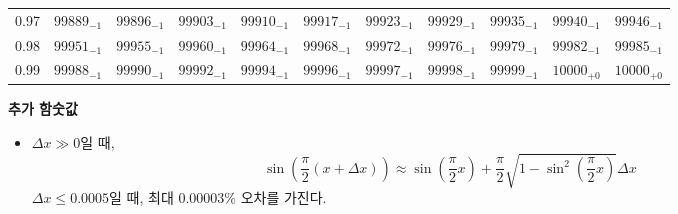 \documentclass[10pt, a4paper]{article}
\begin{document}
\begin{center}
\begin{longtable}{c | c c c c c | c c c c c}
        0.97 & \({99889}_{-1}\) & \({99896}_{-1}\) & \({99903}_{-1}\) & \({99910}_{-1}\) & \({99917}_{-1}\) & \({99923}_{-1}\) & \({99929}_{-1}\) & \({99935}_{-1}\) & \({99940}_{-1}\) & \({99946}_{-1}\)\\
        0.98 & \({99951}_{-1}\) & \({99955}_{-1}\) & \({99960}_{-1}\) & \({99964}_{-1}\) & \({99968}_{-1}\) & \({99972}_{-1}\) & \({99976}_{-1}\) & \({99979}_{-1}\) & \({99982}_{-1}\) & \({99985}_{-1}\)\\
        0.99 & \({99988}_{-1}\) & \({99990}_{-1}\) & \({99992}_{-1}\) & \({99994}_{-1}\) & \({99996}_{-1}\) & \({99997}_{-1}\) & \({99998}_{-1}\) & \({99999}_{-1}\) & \({10000}_{+0}\) & \({10000}_{+0}\)\\
        \hline
    \end{longtable}
    \textbf{추가 함숫값}
    \begin{itemize}
        \item \(\Delta x \gg 0\)일 때, 
        \[\sin\left(\frac{\pi}{2}\left(x+\Delta x\right)\right) \approx 
        \sin{\left(\frac{\pi}{2}x\right)} + \frac{\pi}{2}\sqrt{1-\sin^{2}\left(\frac{\pi}{2}x\right)}\Delta x\]
        \(\Delta x \leq 0.0005\)일 때, 최대 \(0.00003\)\% 오차를 가진다. 
    \end{itemize}
\end{center}
\pagebreak
\end{document}
